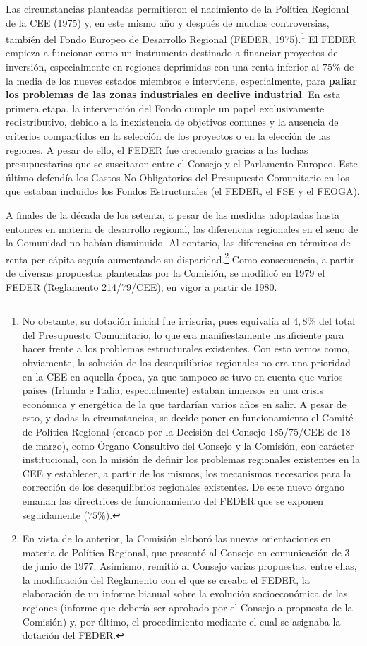 \documentclass[10pt,a4paper]{article}
\begin{document}
Las circunstancias planteadas permitieron el nacimiento de la Política Regional de la CEE (1975) y, en este mismo año y después de muchas controversias, también del Fondo Europeo de Desarrollo Regional (FEDER, 1975).\footnote{%
    No obstante, su dotación inicial fue irrisoria, pues equivalía al $4,8\%$ del total del Presupuesto Comunitario, lo que era manifiestamente insuficiente para hacer frente a los problemas estructurales existentes. Con esto vemos como, obviamente, la solución de los desequilibrios regionales no era una prioridad en la CEE en aquella época, ya que tampoco se tuvo en cuenta que varios países (Irlanda e Italia, especialmente) estaban inmersos en una crisis económica y energética de la que tardarían varios años en salir. A pesar de esto, y dadas la circunstancias, se decide poner en funcionamiento el Comité de Política Regional (creado por la Decisión del Consejo 185/75/CEE de 18 de marzo), como Órgano Consultivo del Consejo y la Comisión, con carácter institucional, con la misión de definir los problemas regionales existentes en la CEE y establecer, a partir de los mismos, los mecanismos necesarios para la corrección de los desequilibrios regionales existentes. De este nuevo órgano emanan las directrices de funcionamiento del FEDER que se exponen seguidamente ($75\%$).
} El FEDER empieza a funcionar como un instrumento destinado a financiar proyectos de inversión, especialmente en regiones deprimidas con una renta inferior al $75\%$ de la media de los nueves estados miembros e interviene, especialmente, para \textbf{paliar los problemas de las zonas industriales en declive industrial}. En esta primera etapa, la intervención del Fondo cumple un papel exclusivamente redistributivo, debido a la inexistencia de objetivos comunes y la ausencia de criterios compartidos en la selección de los proyectos o en la elección de las regiones. A pesar de ello, el FEDER fue creciendo gracias a las luchas presupuestarias que se suscitaron entre el Consejo y el Parlamento Europeo. Este último defendía los Gastos No Obligatorios del Presupuesto Comunitario en los que estaban incluidos los Fondos Estructurales (el FEDER, el FSE y el FEOGA).

A finales de la década de los setenta, a pesar de las medidas adoptadas hasta entonces en materia de desarrollo regional, las diferencias regionales en el seno de la Comunidad no habían disminuido. Al contario, las diferencias en términos de renta per cápita seguía aumentando su disparidad.\footnote{%
    En vista de lo anterior, la Comisión elaboró las nuevas orientaciones en materia de Política Regional, que presentó al Consejo en comunicación de 3 de junio de 1977. Asimismo, remitió al Consejo varias propuestas, entre ellas, la modificación del Reglamento con el que se creaba el FEDER, la elaboración de un informe bianual sobre la evolución socioeconómica de las regiones (informe que debería ser aprobado por el Consejo a propuesta de la Comisión) y, por último, el procedimiento mediante el cual se asignaba la dotación del FEDER.
} Como consecuencia, a partir de diversas propuestas planteadas por la Comisión, se modificó en 1979 el FEDER (Reglamento 214/79/CEE), en vigor a partir de 1980. 
\end{document}
